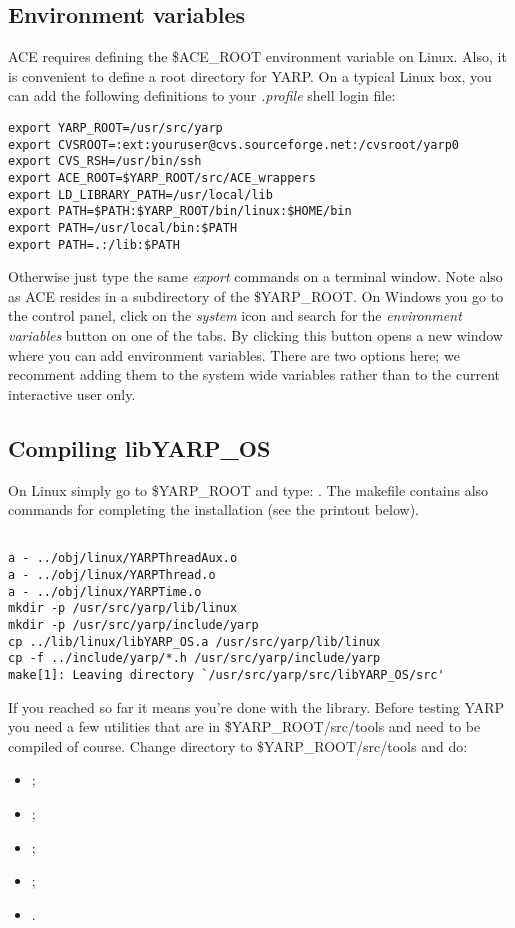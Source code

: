 \subsection{Environment variables}
ACE requires defining the \$ACE\_ROOT environment variable on Linux. Also, it is convenient to define a root directory for YARP. On a typical Linux box, you can add the following definitions to your {\em .profile} shell login file:

\begin{verbatim}
export YARP_ROOT=/usr/src/yarp
export CVSROOT=:ext:youruser@cvs.sourceforge.net:/cvsroot/yarp0
export CVS_RSH=/usr/bin/ssh
export ACE_ROOT=$YARP_ROOT/src/ACE_wrappers
export LD_LIBRARY_PATH=/usr/local/lib
export PATH=$PATH:$YARP_ROOT/bin/linux:$HOME/bin
export PATH=/usr/local/bin:$PATH
export PATH=.:/lib:$PATH
\end{verbatim}

Otherwise just type the same {\em export} commands on a terminal window. Note also as ACE resides in a subdirectory of the \$YARP\_ROOT. On Windows you go to the control panel, click on the {\em system} icon and search for the {\em environment variables} button on one of the tabs. By clicking this button opens a new window where you can add environment variables. There are two options here; we recomment adding them to the system wide variables rather than to the current interactive user only. 

\subsection{Compiling libYARP\_OS}

On Linux simply go to \$YARP\_ROOT and type: . The makefile contains also commands for completing the installation (see the printout below). 
\begin{verbatim}

a - ../obj/linux/YARPThreadAux.o
a - ../obj/linux/YARPThread.o
a - ../obj/linux/YARPTime.o
mkdir -p /usr/src/yarp/lib/linux
mkdir -p /usr/src/yarp/include/yarp
cp ../lib/linux/libYARP_OS.a /usr/src/yarp/lib/linux
cp -f ../include/yarp/*.h /usr/src/yarp/include/yarp
make[1]: Leaving directory `/usr/src/yarp/src/libYARP_OS/src'

\end{verbatim}

If you reached so far it means you're done with the library. Before testing YARP you need a few utilities that are in \$YARP\_ROOT/src/tools and need to be compiled of course. Change directory to \$YARP\_ROOT/src/tools and do:
\begin{itemize}
\item {};
\item {};
\item {};
\item {};
\item {}.
\end{itemize}

